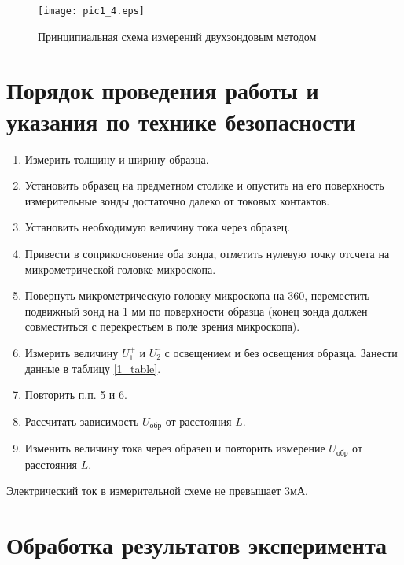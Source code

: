 \begin{figure}[h!]\centering
\texttt{[image: pic1\_4.eps]}
\caption{Принципиальная схема измерений двухзондовым методом}
\label{1_condtype}
\end{figure}

\section{Порядок проведения работы и указания по технике безопасности}

\begin{enumerate}
\item Измерить толщину и ширину образца.
\item Установить образец на предметном столике и опустить на его поверхность измерительные зонды достаточно далеко от токовых контактов.
\item Установить необходимую величину тока через образец.
\item Привести в соприкосновение оба зонда, отметить нулевую точку отсчета на микрометрической головке микроскопа.
\item Повернуть микрометрическую головку микроскопа на 360\textdegree, переместить подвижный зонд на 1 мм по поверхности образца (конец зонда должен совместиться с перекрестьем в поле зрения микроскопа).
\item Измерить величину $U_{1}^{+}$ и $U_{2}^{–}$ с освещением и без освещения образца. Занести данные в таблицу \ref{1_table}.
\item Повторить п.п. 5 и 6.
\item Рассчитать зависимость $U_{\text{обр}}$ от расстояния $L$.
\item Изменить величину тока через образец и повторить измерение $U_{\text{обр}}$ от расстояния $L$.
\end{enumerate}

Электрический ток в измерительной схеме не превышает 3мА.

\section{Обработка результатов эксперимента}

